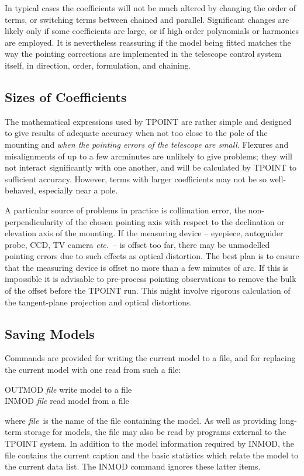In typical cases the coefficients will not be much altered by changing
the order of terms, or switching terms between chained and
parallel.  Significant changes are likely only if some
coefficients are large, or if high order polynomials or
harmonics are employed.  It is nevertheless reassuring
if the model being fitted matches the way the
pointing corrections are implemented in the telescope control
system itself, in direction, order, formulation, and chaining.

\subsection{Sizes of Coefficients}
The mathematical expressions used by TPOINT are rather simple and
designed to give results of adequate accuracy when not too close
to the pole of the mounting and {\it when the
pointing errors of the telescope are small}.  Flexures and misalignments
of up to a few arcminutes are unlikely to give problems;  they will not
interact significantly with one another, and will be calculated by
TPOINT to sufficient accuracy.  However, terms with larger
coefficients may not be so well-behaved, especially near a pole.

A particular source of problems in practice is collimation error, the
non-perpendicularity of the chosen pointing axis with respect to
the declination or elevation axis of the mounting.  If the measuring
device -- eyepiece, autoguider probe, CCD, TV camera {\it etc.}\ --
is offset too far, there may be unmodelled pointing errors due to
such effects as optical distortion.  The best
plan is to ensure that the measuring device is offset no more than a few
minutes of arc.  If this is impossible it is advisable to pre-process
pointing observations to remove the bulk of the offset before the
TPOINT run.  This might involve rigorous calculation of the
tangent-plane projection and optical distortions.

\subsection{Saving Models}
Commands are provided for writing the current model to a file, and
for replacing the current model with one read from such a file:
\begin{cmnds}
\> \> OUTMOD {\it file} \> write model to a file \\
\> \> INMOD {\it file} \> read model from a file
\end{cmnds}
where {\it file}\, is the name of the
file containing the model.  As well as providing long-term
storage for models, the file may also be read by programs
external to the TPOINT system.  In addition to the
model information required by INMOD, the
file contains the current caption and
the basic statistics which relate the model to the current
data list.  The INMOD command ignores these latter
items.

